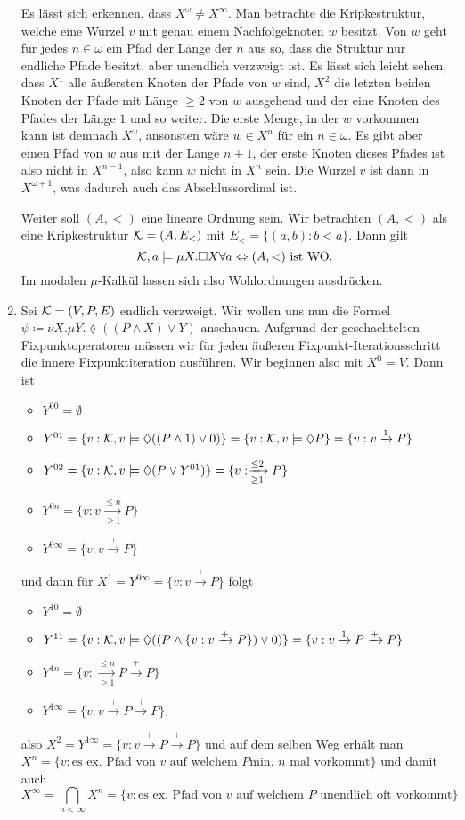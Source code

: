 \begin{enumerate}
	Es lässt sich erkennen, dass $X^\omega\neq X^\infty$. Man betrachte die Kripkestruktur, welche eine Wurzel $v$ mit genau einem Nachfolgeknoten $w$ besitzt. Von $w$ geht für jedes $n\in\omega$ ein Pfad der Länge der $n$ aus so, dass die Struktur nur endliche Pfade besitzt, aber unendlich verzweigt ist. 
	Es lässt sich leicht sehen, dass $X^1$ alle äußersten Knoten der Pfade von $w$ sind, $X^2$ die letzten beiden Knoten der Pfade mit Länge $\geq 2$ von $w$ ausgehend und der eine Knoten des Pfades der Länge $1$ und so weiter. Die erste Menge, in der $w$ vorkommen kann ist demnach $X^\omega$, ansonsten wäre $w\in X^n$ für ein $n\in \omega$. Es gibt aber einen Pfad von $w$ aus mit der Länge $n+1$, der erste Knoten dieses Pfades ist also nicht in $X^{n-1}$, also kann $w$ nicht in $X^n$ sein. 
	Die Wurzel $v$ ist dann in $X^{\omega+1}$, was dadurch auch das Abschlussordinal ist.
	
	Weiter soll $(A,<)$ eine lineare Ordnung sein. Wir betrachten $(A,<)$ als eine Kripkestruktur $\mathcal{K}=(A,E_<)$ mit $E_<=\{(a,b): b < a\}$. Dann gilt $$\mathcal{K},a\models \mu X.\square X \forall a \Leftrightarrow (A,<) \text{ ist WO}.$$ Im modalen $\mu$-Kalkül lassen sich also Wohlordnungen ausdrücken.
	
	\item Sei $\mathcal{K}=(V,P,E)$ endlich verzweigt. Wir wollen uns nun die Formel $\psi\coloneqq \nu X . \mu Y.\lozenge((P\land X) \lor Y)$ anschauen. Aufgrund der geschachtelten Fixpunktoperatoren müssen wir für jeden äußeren Fixpunkt-Iterationsschritt die innere Fixpunktiteration ausführen. Wir beginnen also mit $X^0=V$.
	Dann ist
	\begin{itemize}
		\item $Y^{00}=\emptyset$
		\item $Y^{01}=\{v : \mathcal{K},v\models \lozenge((P\land 1) \lor 0)\}=\{v : \mathcal{K},v\models \lozenge P\}=\{v : v\xrightarrow{1} P\}$
		\item $Y^{02}=\{v : \mathcal{K},v\models \lozenge(P \lor Y^{01})\}=\{v : \xrightarrow[\geq 1]{\leq 2}P\}$
		\item $Y^{0n}=\{v : v \xrightarrow[\geq 1]{\leq n} P\}$
		\item $Y^{0\infty}=\{v : v\xrightarrow{+}P\}$
	\end{itemize}
	und dann für $X^1 = Y^{0\infty} = \{v : v\xrightarrow{+}P\}$ folgt
	\begin{itemize}
		\item $Y^{10}=\emptyset$
		\item $Y^{11}=\{v : \mathcal{K},v\models \lozenge((P\land \{v : v\xrightarrow{+}P\}) \lor 0)\}=\{v : v\xrightarrow{1}P\xrightarrow{+}P\}$
		\item $Y^{1n}=\{v : \xrightarrow[\geq 1]{\leq n}P\xrightarrow{+}P\}$
		\item $Y^{1\infty}=\{v : v\xrightarrow{+}P\xrightarrow{+}P\}$,
	\end{itemize}
	also $X^2 = Y^{1\infty}=\{v : v\xrightarrow{+}P\xrightarrow{+}P\}$ und auf dem selben Weg erhält man $X^n=\{v : \text{es ex. Pfad von } v \text{ auf welchem } P \text{min. } n \text{ mal vorkommt}\}$ und damit auch $$X^\infty = \bigcap_{n<\infty}X^n=\{v : \text{es ex. Pfad von } v \text{ auf welchem } P \text{ unendlich oft vorkommt}\}$$
\end{enumerate}

